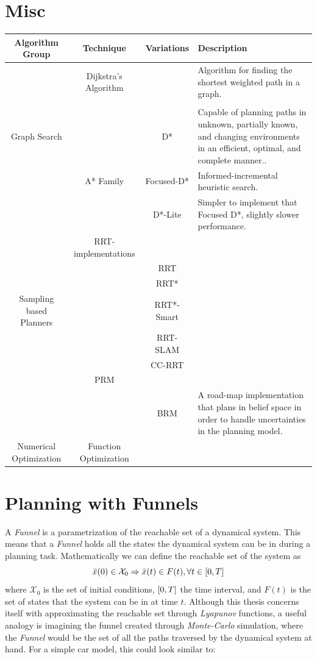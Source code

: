 \section{Misc}

\begin{table}
  \begin{tabular}{c c c p{4cm}}
    \hline
    \hline
    Algorithm Group & Technique & Variations & Description \\
    \hline
                    &  Dijkstra's Algorithm & &Algorithm for finding the shortest weighted path in a graph.\\
                    &  \\
    Graph Search               & & D* & Capable of planning paths in unknown, partially known, and changing environments in an efficient, optimal, and complete manner..\\
                    & A* Family & Focused-D* & Informed-incremental heuristic search.\\
                    & & D*-Lite & Simpler to implement that Focused D*, slightly slower performance.\\
    \hline
                    & RRT-implementations \\
                    & & RRT\\
                    & & RRT*\\
    Sampling based Planners& & RRT*-Smart\\
                    & & RRT-SLAM\\
                    & & CC-RRT\\
                    & PRM \\
                    & & BRM & A road-map implementation that plans in belief space in order to handle uncertainties in the planning model.\\
    \hline
    Numerical Optimization &  Function Optimization \\
    \hline
  \end{tabular} 
\end{table}

\section{Planning with Funnels}

A \textit{Funnel} is a parametrization of the reachable set of a dynamical
system. This means that a \textit{Funnel} holds all the states the dynamical
system can be in during a planning task. Mathematically we can define the
reachable set of the system as
\[
  \bar{x}(0) \in \mathcal{X}_0 \Rightarrow \bar{x}(t) \in F(t), \forall t \in
  \lbrack0,T\rbrack
\]
where \(\mathcal{X}_0\) is the set of initial conditions, \(\lbrack0,T\rbrack\) the time
interval, and \(F(t)\) is the set of states that the system can be in at time
\(t\). Although this thesis concerns itself with approximating the reachable set
through \textit{Lyapunov} functions, a useful analogy is imagining the funnel
created through \textit{Monte-Carlo} simulation, where the \textit{Funnel} would
be the set of all the paths traversed by the dynamical system at hand. For a
simple car model, this could look similar to:


